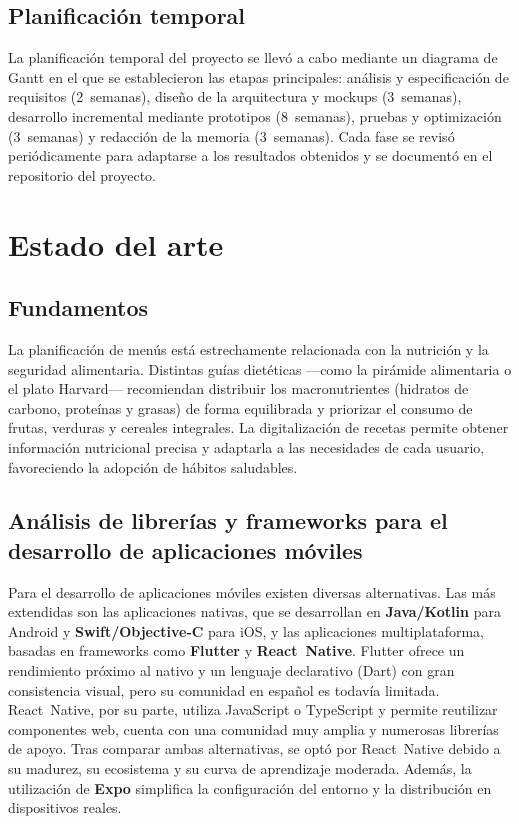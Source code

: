 \documentclass[twoside, openright, 11pt]{report}
\begin{document}
\section{Planificación temporal}
La planificación temporal del proyecto se llevó a cabo mediante un diagrama de Gantt en el que se establecieron las etapas principales: análisis y especificación de requisitos (2~semanas), diseño de la arquitectura y mockups (3~semanas), desarrollo incremental mediante prototipos (8~semanas), pruebas y optimización (3~semanas) y redacción de la memoria (3~semanas). Cada fase se revisó periódicamente para adaptarse a los resultados obtenidos y se documentó en el repositorio del proyecto.

\chapter{Estado del arte}\label{cap.estado del arte}
\section{Fundamentos}
La planificación de menús está estrechamente relacionada con la nutrición y la seguridad alimentaria. Distintas guías dietéticas —como la pirámide alimentaria o el plato Harvard— recomiendan distribuir los macronutrientes (hidratos de carbono, proteínas y grasas) de forma equilibrada y priorizar el consumo de frutas, verduras y cereales integrales. La digitalización de recetas permite obtener información nutricional precisa y adaptarla a las necesidades de cada usuario, favoreciendo la adopción de hábitos saludables.

\section{Análisis de librerías y frameworks para el desarrollo de aplicaciones móviles}
Para el desarrollo de aplicaciones móviles existen diversas alternativas. Las más extendidas son las aplicaciones nativas, que se desarrollan en \textbf{Java/Kotlin} para Android y \textbf{Swift/Objective‑C} para iOS, y las aplicaciones multiplataforma, basadas en frameworks como \textbf{Flutter} y \textbf{React Native}. Flutter ofrece un rendimiento próximo al nativo y un lenguaje declarativo (Dart) con gran consistencia visual, pero su comunidad en español es todavía limitada. React Native, por su parte, utiliza JavaScript o TypeScript y permite reutilizar componentes web, cuenta con una comunidad muy amplia y numerosas librerías de apoyo. Tras comparar ambas alternativas, se optó por React Native debido a su madurez, su ecosistema y su curva de aprendizaje moderada. Además, la utilización de \textbf{Expo} simplifica la configuración del entorno y la distribución en dispositivos reales.
\end{document}
